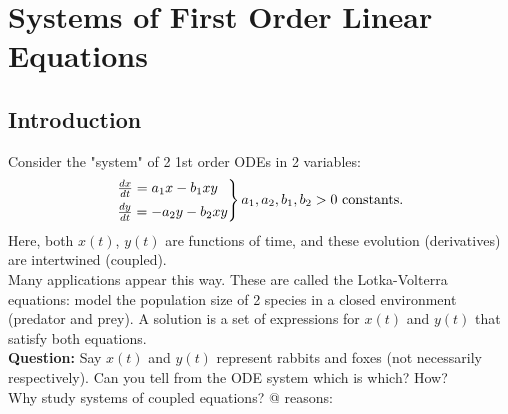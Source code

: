 \section*{Systems of First Order Linear Equations}
\subsection*{Introduction}
Consider the "system" of 2 1st order ODEs in 2 variables:
\begin{equation*}
	\begin{rcases}
		\frac{dx}{dt} = a_1x - b_1 xy\\
		\frac{dy}{dt} = -a_2y - b_2 xy
	\end{rcases} a_1, a_2, b_1, b_2 > 0 \text{ constants.}
\end{equation*}
Here, both $x(t)$, $y(t)$ are functions of time, and these evolution (derivatives) are intertwined (coupled).\\
Many applications appear this way. These are called the Lotka-Volterra equations: model the population size of 2 species in a closed environment (predator and prey). A solution is a set of expressions for $x(t)$ and $y(t)$ that satisfy both equations.\\
\textbf{Question:  } Say $x(t)$ and $y(t)$ represent rabbits and foxes (not necessarily respectively). Can you tell from the ODE system which is which? How?\\
Why study systems of coupled equations? @ reasons:
